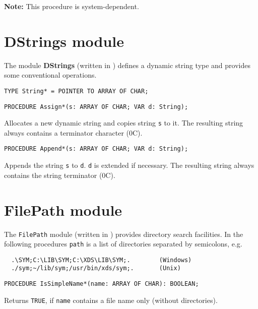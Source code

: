 
{\bf Note:} This procedure is system-dependent.

\section{DStrings module}
\renewcommand{\ModuleI}{DStrings}
\OneModule

The module {\bf DStrings} (written in \ot{}) defines
a dynamic string type and provides some conventional operations.

{\samepage
{}
\begin{verbatim}
TYPE String* = POINTER TO ARRAY OF CHAR;
\end{verbatim}
}
\ModuleList

{\samepage
{}
\begin{verbatim}
PROCEDURE Assign*(s: ARRAY OF CHAR; VAR d: String);
\end{verbatim}
}
\ModuleList
Allocates a new dynamic string and copies string {\tt s} to it.
The resulting string always contains a terminator character (0C).

{\samepage
{}
\begin{verbatim}
PROCEDURE Append*(s: ARRAY OF CHAR; VAR d: String);
\end{verbatim}
}
\ModuleList
Appends the string {\tt s} to {\tt d}. {\tt d} is extended if necessary.
The resulting string always contains the string terminator (0C).


\section{FilePath module}
\renewcommand{\ModuleI}{FilePath}
\OneModule

The {\tt FilePath} module (written in \ot{}) provides directory
search facilities. In the following procedures {\tt path} is a
list of directories separated by semicolons, e.g.
\begin{verbatim}
  .\SYM;C:\LIB\SYM;C:\XDS\LIB\SYM;.        (Windows)
  ./sym;~/lib/sym;/usr/bin/xds/sym;.       (Unix)
\end{verbatim}

{\samepage
{}
\begin{verbatim}
PROCEDURE IsSimpleName*(name: ARRAY OF CHAR): BOOLEAN;
\end{verbatim}
}
\ModuleList
Returns \verb'TRUE', if {\tt name} contains a file name only
(without directories).

